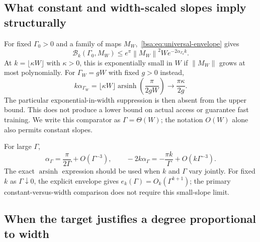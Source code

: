 \documentclass[11pt,letterpaper]{article}
\newcommand{\bsaNorm}[1]{\left\lVert #1\right\rVert}
\DeclareMathOperator{\bsaArsinh}{arsinh}
\theoremstyle{remark}
\theoremstyle{plain}
\begin{document}
\subsection{What constant and width-scaled slopes imply structurally}
For fixed $\Gamma_0>0$ and a family of maps $M_W$,~\eqref{bsa:eq:universal-envelope} gives
\begin{equation}
 \mathcal B_k(\Gamma_0,M_W)
 \le e^\pi\bsaNorm{M_W}^2W e^{-2\alpha_{\Gamma_0}k}.
 \label{bsa:eq:constant-gamma}
\end{equation}
At $k=\lfloor\kappa W\rfloor$ with $\kappa>0$, this is exponentially small in $W$ if $\bsaNorm{M_W}$ grows at most polynomially. For $\Gamma_W=gW$ with fixed $g>0$ instead,
\begin{equation}
 k\alpha_{\Gamma_W}
 =\lfloor\kappa W\rfloor\bsaArsinh\!\left(\frac\pi{2gW}\right)
 \longrightarrow\frac{\pi\kappa}{2g}.
 \label{bsa:eq:linear-gamma}
\end{equation}
The particular exponential-in-width suppression is then absent from the upper bound. This does not produce a lower bound on actual access or guarantee fast training. We write this comparator as $\Gamma=\Theta(W)$; the notation $O(W)$ alone also permits constant slopes.

For large $\Gamma$,
\begin{equation}
 \alpha_\Gamma=\frac\pi{2\Gamma}+O(\Gamma^{-3}),\qquad
 -2k\alpha_\Gamma=-\frac{\pi k}{\Gamma}+O(k\Gamma^{-3}).
 \label{bsa:eq:large-gamma}
\end{equation}
The exact $\bsaArsinh$ expression should be used when $k$ and $\Gamma$ vary jointly. For fixed $k$ as $\Gamma\downarrow0$, the explicit envelope gives $e_k(\Gamma)=O_k(\Gamma^{k+1})$; the primary constant-versus-width comparison does not require this small-slope limit.

\subsection{When the target justifies a degree proportional to width}
\end{document}
